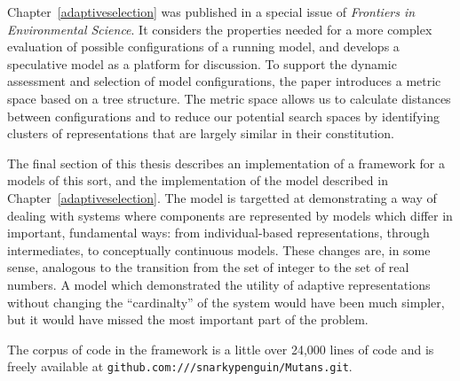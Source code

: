 Chapter~\ref{adaptiveselection} was published in a special issue
of \emph{Frontiers in Environmental Science\/}. It considers the 
properties needed for a more complex evaluation of possible
configurations of a running model, and develops a speculative model as
a platform for discussion.  To support the dynamic assessment and
selection of model configurations, the paper introduces a metric space
based on a tree structure. The metric space allows us to calculate
distances between configurations and to reduce our potential search
spaces by identifying clusters of representations that are largely
similar in their constitution.


The final section of this thesis describes an implementation of a
framework for a models of this sort, and the implementation of the
model described in Chapter~\ref{adaptiveselection}. The model is
targetted at demonstrating a way of dealing with systems where
components are represented by models which differ in important,
fundamental ways: from individual-based representations, through
intermediates, to conceptually continuous models. These changes are,
in some sense, analogous to the transition from the set of integer to
the set of real numbers.  A model which demonstrated the utility of
adaptive representations without changing the ``cardinalty'' of the
system would have been much simpler, but it would have missed the most
important part of the problem.

The corpus of code in the framework is a little over 24,000 lines of
\Scheme code and is freely available
at \texttt{github.com:///snarkypenguin/Mutans.git}.



